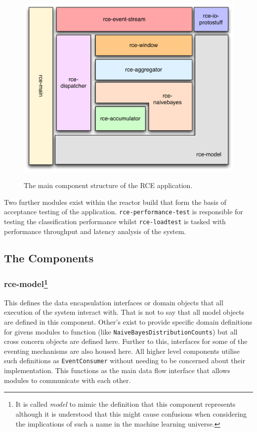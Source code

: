 \documentclass[a4paper,11pt]{scrreprt}
\begin{document}
\begin{figure}[h!]
\centering
\caption{The main component structure of the RCE application.}
\includegraphics[scale=0.35, trim=0 0 0 0, clip=true] {reactor-layout.pdf}
\label{fig:indexes}
\end{figure}

Two further modules exist within the reactor build that form the basis of acceptance testing of the application. \verb|rce-performance-test| is responsible for testing the classification performance whilst \verb|rce-loadtest| is tasked with performance throughput and latency analysis of the system.

\subsection{The Components}
\subsubsection[rce-model]{rce-model\protect\footnote{It is called \textit{model} to mimic the  definition that this component represents although it is understood that this might cause confusions when considering the implications of such a name in the machine learning universe.}}
This defines the data encapsulation interfaces or domain objects that all execution of the system interact with. That is not to say that all model objects are defined in this component. Other's exist to provide specific domain definitions for givens modules to function (like \verb|NaiveBayesDistributionCounts|) but all cross concern objects are defined here. Further to this, interfaces for some of the eventing mechanisms are also housed here. All higher level components utilise such definitions as \verb|EventConsumer| without needing to be concerned about their implementation. This functions as the main data flow interface that allows modules to communicate with each other.
\end{document}
